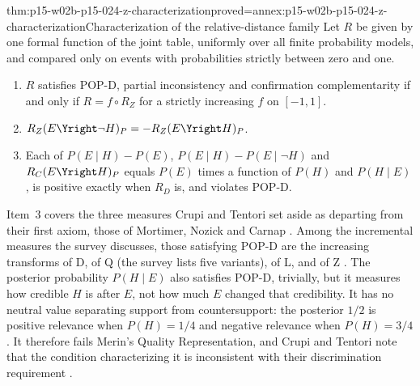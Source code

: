\begin{hbtheorem}{thm:p15-w02b-p15-024-z-characterization}{proved=annex:p15-w02b-p15-024-z-characterization}{Characterization of the relative-distance family}
Let \(R\) be given by one formal function of the joint table, uniformly
over all finite probability models, and compared only on events with
probabilities strictly between zero and one.
\begin{enumerate}
\item \(R\) satisfies POP-D, partial inconsistency and confirmation
  complementarity if and only if \(R=f\circ R_Z\) for a strictly
  increasing \(f\) on \([-1,1]\).
\item \(R_Z(E\Yright\neg H)_P=-R_Z(E\Yright H)_P\).
\item Each of \(P(E\mid H)-P(E)\), \(P(E\mid H)-P(E\mid\neg H)\) and
  \(R_C(E\Yright H)_P\) equals \(P(E)\) times a function of \(P(H)\)
  and \(P(H\mid E)\), is positive exactly when \(R_D\) is, and
  violates POP-D.
\end{enumerate}
\end{hbtheorem}

Item~3 covers the three measures Crupi and Tentori set aside as
departing from their first axiom, those of Mortimer, Nozick and Carnap
\cite[p.~656, n.~9]{CrupiTentori2016Confirmation}. Among the
incremental measures the survey discusses, those satisfying POP-D are
the increasing transforms of D, of Q (the survey lists five variants),
of L, and of Z \cite[pp.~655, 658]{CrupiTentori2016Confirmation}.
The posterior probability \(P(H\mid E)\) also satisfies POP-D, trivially,
but it measures how credible \(H\) is after \(E\), not how much \(E\)
changed that credibility. It has no neutral value separating support
from countersupport: the posterior \(1/2\) is positive relevance when
\(P(H)=1/4\) and negative relevance when \(P(H)=3/4\). It therefore
fails Merin's Quality Representation, and
Crupi and Tentori note that the condition characterizing it is
inconsistent with their discrimination requirement
\cite[p.~269]{Merin2021Relevance}
\cite[p.~656, n.~10]{CrupiTentori2016Confirmation}.

